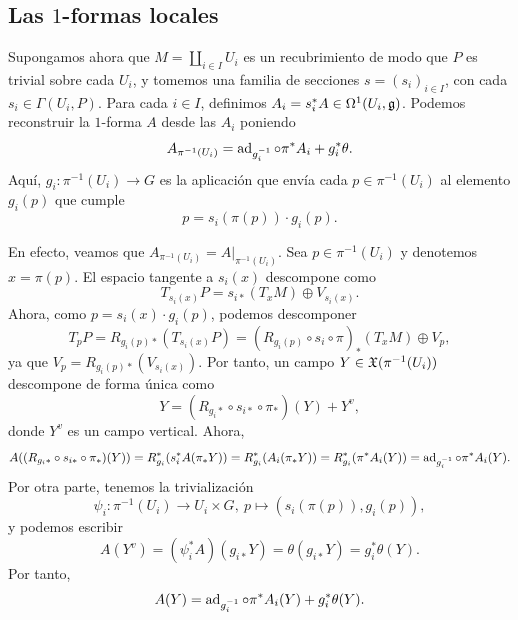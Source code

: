 \documentclass[11pt,a4paper]{amsbook}
\theoremstyle{remark} \newtheorem{rmk}[subsection]{Observación}
\theoremstyle{definition} \newtheorem{defn}[subsection]{Definición}
\theoremstyle{definition} \newtheorem{ex}[subsection]{Ejemplo}
\theoremstyle{definition} \newtheorem{ej}[subsection]{Ejercicio}
\begin{document}
\subsection{Las $1$-formas locales} Supongamos ahora que $M=\coprod_{i\in I} U_i$ es un recubrimiento de modo que $P$ es trivial sobre cada $U_i$, y tomemos una familia de secciones $s=(s_i)_{i\in I}$, con cada $s_i\in \Gamma(U_i,P)$. Para cada $i\in I$, definimos $A_i = s_i^* A \in \Omega^1(U_i,\mathfrak{g})$. Podemos reconstruir la $1$-forma $A$ desde las $A_i$ poniendo
\begin{equation*}
A_{\pi^{-1}(U_i)} = \operatorname{ad}_{g_i^{-1}} \circ \pi^* A_i + g_i^* \theta.
\end{equation*}
Aquí, $g_i:\pi^{-1}(U_i) \rightarrow G$ es la aplicación que envía cada $p\in \pi^{-1}(U_i)$ al elemento $g_i(p)$ que cumple
\begin{equation*}
p = s_i(\pi(p))\cdot g_i(p).
\end{equation*}

En efecto, veamos que $A_{\pi^{-1}(U_i)}=A|_{\pi^{-1}(U_i)}$. Sea $p\in \pi^{-1}(U_i)$ y denotemos $x=\pi(p)$. El espacio tangente a $s_i(x)$ descompone como
\begin{equation*}
T_{s_i(x)} P = s_{i*}(T_{x} M) \oplus V_{s_i(x)}.
\end{equation*}
Ahora, como $p=s_i(x)\cdot g_i(p)$, podemos descomponer
\begin{equation*}
T_pP = R_{g_i(p)*}(T_{s_i(x)} P) =(R_{g_i(p)}\circ s_i \circ \pi)_*(T_{x} M) \oplus V_p,
\end{equation*}
ya que $V_p = R_{g_i(p)*}(V_{s_i(x)})$.
Por tanto, un campo $Y\in \mathfrak X(\pi^{-1}(U_i))$ descompone de forma única como
\begin{equation*}
Y = (R_{g_i*}\circ s_{i*}\circ \pi_*) (Y) + Y^v,
\end{equation*}
donde $Y^v$ es un campo vertical.
Ahora,
\begin{equation*}
A((R_{g_i*}\circ s_{i*}\circ \pi_*) (Y)) = R_{g_i}^*(s_i^* A(\pi_*Y)) = R_{g_i}^* (A_i(\pi_* Y)) = R_{g_i}^*(\pi^* A_i(Y)) = \operatorname{ad}_{g_i^{-1}} \circ \pi^* A_i (Y).
\end{equation*}
Por otra parte, tenemos la trivialización
\begin{equation*}
\psi_i: \pi^{-1}(U_i) \rightarrow U_i \times G,\ p \mapsto (s_i(\pi(p)), g_i(p)),
\end{equation*}
y podemos escribir
\begin{equation*}
A(Y^v) = (\psi_i^* A)(g_{i*} Y) = \theta(g_{i*} Y) = g_i^* \theta (Y).
\end{equation*}
Por tanto,
\begin{equation*}
A(Y) = \operatorname{ad}_{g_i^{-1}} \circ \pi^* A_i (Y) + g_i^*\theta(Y).
\end{equation*}
\end{document}

